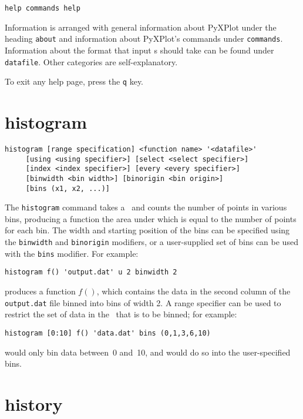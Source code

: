 \begin{verbatim}
help commands help
\end{verbatim}

Information is arranged with general information about PyXPlot under the heading
{\tt about} and information about PyXPlot's commands under {\tt commands}.
Information about the format that input \datafile s should take can be found
under {\tt datafile}.  Other categories are self-explanatory.

To exit any help page, press the {\tt q} key.


\section{histogram}

\begin{verbatim}
histogram [range specification] <function name> '<datafile>'
     [using <using specifier>] [select <select specifier>]
     [index <index specifier>] [every <every specifier>]
     [binwidth <bin width>] [binorigin <bin origin>]
     [bins (x1, x2, ...)]
\end{verbatim}

The {\tt histogram} command takes a \datafile\ and counts the number of points
in various bins, producing a function the area under which is equal to the
number of points for each bin.  The width and starting position of the bins can
be specified using the {\tt binwidth} and {\tt binorigin} modifiers, or a
user-supplied set of bins can be used with the {\tt bins} modifier.  For
example:

\begin{verbatim}
histogram f() 'output.dat' u 2 binwidth 2
\end{verbatim}

\noindent produces a function $f()$, which contains the data in the second
column of the {\tt output.dat} file binned into bins of width 2.  A range
specifier can be used to restrict the set of data in the \datafile\ that is to be
binned; for example:

\begin{verbatim}
histogram [0:10] f() 'data.dat' bins (0,1,3,6,10)
\end{verbatim}

\noindent would only bin data between~0 and~10, and would do so into the
user-specified bins.


\section{history}

